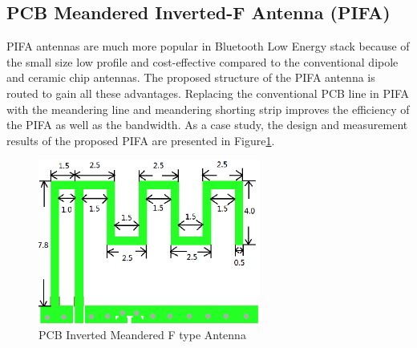 \subsection{PCB Meandered Inverted-F Antenna (PIFA)}

PIFA antennas are much more popular in Bluetooth Low Energy stack because of the small size low profile and cost-effective compared to the conventional dipole and ceramic chip antennas.
The proposed structure of the PIFA antenna is routed to gain all these advantages.
Replacing the conventional PCB line in PIFA with the meandering line and meandering shorting strip
improves the efficiency of the PIFA as well as the bandwidth. As a case study, the design and measurement results of the
proposed PIFA are presented \cite{PIFA2017Cheuk} in Figure\ref{fig:PIFA_Antenna_1}.


\begin{figure}[ht]
	\centering
	\includegraphics[width=0.65\textwidth]{Chap03/Figures/MIFA_Antenna.PNG}
	\caption{PCB Inverted Meandered F type Antenna }
	\label{fig:PIFA_Antenna_1}
\end{figure}

